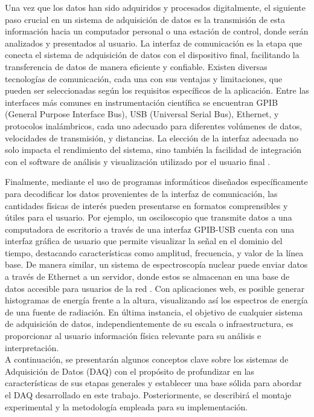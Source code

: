 \documentclass[]{book}
\begin{document}
\noindent Una vez que los datos han sido adquiridos y procesados digitalmente, el siguiente paso crucial en un sistema de adquisición de datos es la transmisión de esta información hacia un computador personal o una estación de control, donde serán analizados y presentados al usuario. La interfaz de comunicación es la etapa que conecta el sistema de adquisición de datos con el dispositivo final, facilitando la transferencia de datos de manera eficiente y confiable. Existen diversas tecnologías de comunicación, cada una con sus ventajas y limitaciones, que pueden ser seleccionadas según los requisitos específicos de la aplicación. Entre las interfaces más comunes en instrumentación científica se encuentran GPIB (General Purpose Interface Bus), USB (Universal Serial Bus), Ethernet, y protocolos inalámbricos, cada uno adecuado para diferentes volúmenes de datos, velocidades de transmisión, y distancias. La elección de la interfaz adecuada no solo impacta el rendimiento del sistema, sino también la facilidad de integración con el software de análisis y visualización utilizado por el usuario final \cite{austerlitz2014data}.

\noindent Finalmente, mediante el uso de programas informáticos diseñados específicamente para decodificar los datos provenientes de la interfaz de comunicación, las cantidades físicas de interés pueden presentarse en formatos comprensibles y útiles para el usuario. Por ejemplo, un osciloscopio que transmite datos a una computadora de escritorio a través de una interfaz GPIB-USB cuenta con una interfaz gráfica de usuario que permite visualizar la señal en el dominio del tiempo, destacando características como amplitud, frecuencia, y valor de la línea base. De manera similar, un sistema de espectroscopía nuclear puede enviar datos a través de Ethernet a un servidor, donde estos se almacenan en una base de datos accesible para usuarios de la red \cite{crespo2021remote}. Con aplicaciones web, es posible generar histogramas de energía frente a la altura, visualizando así los espectros de energía de una fuente de radiación. En última instancia, el objetivo de cualquier sistema de adquisición de datos, independientemente de su escala o infraestructura, es proporcionar al usuario información física relevante para su análisis e interpretación.\\

\noindent A continuación, se presentarán algunos conceptos clave sobre los sistemas de Adquisición de Datos (DAQ) con el propósito de profundizar en las características de sus etapas generales y establecer una base sólida para abordar el DAQ desarrollado en este trabajo. Posteriormente, se describirá el montaje experimental y la metodología empleada para su implementación.\\
\end{document}
